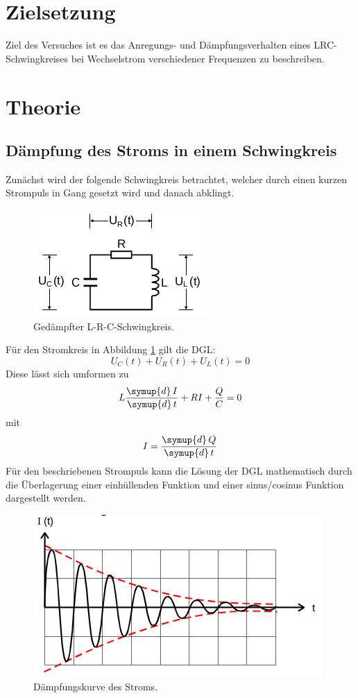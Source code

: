 \section{Zielsetzung}
\label{sec:Zielsetzung}

Ziel des Versuches ist es das Anregungs- und Dämpfungsverhalten eines LRC-Schwingkreises
bei Wechselstrom verschiedener Frequenzen zu beschreiben.


\section{Theorie}
\label{sec:Theorie}

\subsection{Dämpfung des Stroms in einem Schwingkreis}
Zunächst wird der folgende Schwingkreis betrachtet, welcher durch einen
kurzen Strompuls in Gang gesetzt wird und danach abklingt.
\begin{figure}[H]
  \centering
  \includegraphics{content/images/V354.png}
  \caption{Gedämpfter L-R-C-Schwingkreis\cite{anleitung}.}
  \label{fig:schwingkreis}
\end{figure}
Für den Stromkreis in Abbildung \ref{fig:schwingkreis} gilt die
DGL:
\begin{equation}
  U_C(t)+U_R(t)+U_L(t)=0
\end{equation}
Diese lässt sich umformen zu
\begin{equation}
  L\frac{\symup{d}\, I}{\symup{d}\, t} +RI +\frac{Q}{C}=0
\end{equation}
mit
\begin{equation}
  I = \frac{\symup{d}\, Q}{\symup{d}\, t}
\end{equation}
Für den beschriebenen Strompuls kann die Lösung der DGL mathematisch durch die Überlagerung einer
einhüllenden Funktion und einer sinus/cosinus Funktion dargestellt werden.
\begin{figure}[H]
  \centering
  \includegraphics{content/images/dia.png}
  \caption{Dämpfungskurve des Stroms\cite{anleitung}.}
  \label{fig:daempfung}
\end{figure}
